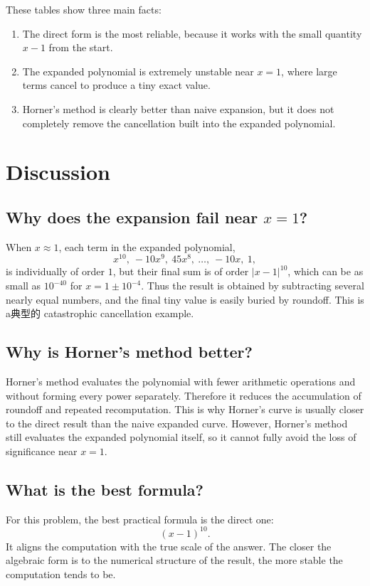 \documentclass[12pt,a4paper]{article}
\begin{document}
These tables show three main facts:
\begin{enumerate}[leftmargin=2.5em]
    \item The direct form is the most reliable, because it works with the small quantity $x-1$ from the start.
    \item The expanded polynomial is extremely unstable near $x=1$, where large terms cancel to produce a tiny exact value.
    \item Horner's method is clearly better than naive expansion, but it does not completely remove the cancellation built into the expanded polynomial.
\end{enumerate}

\section{Discussion}

\subsection{Why does the expansion fail near $x=1$?}
When $x\approx1$, each term in the expanded polynomial,
\[
    x^{10},\ -10x^9,\ 45x^8,\ \dots,\ -10x,\ 1,
\]
is individually of order $1$, but their final sum is of order $|x-1|^{10}$, which can be as small as $10^{-40}$ for $x=1\pm10^{-4}$. Thus the result is obtained by subtracting several nearly equal numbers, and the final tiny value is easily buried by roundoff. This is a典型的 catastrophic cancellation example.

\subsection{Why is Horner's method better?}
Horner's method evaluates the polynomial with fewer arithmetic operations and without forming every power separately. Therefore it reduces the accumulation of roundoff and repeated recomputation. This is why Horner's curve is usually closer to the direct result than the naive expanded curve. However, Horner's method still evaluates the expanded polynomial itself, so it cannot fully avoid the loss of significance near $x=1$.

\subsection{What is the best formula?}
For this problem, the best practical formula is the direct one:
\[
    (x-1)^{10}.
\]
It aligns the computation with the true scale of the answer. The closer the algebraic form is to the numerical structure of the result, the more stable the computation tends to be.
\end{document}
